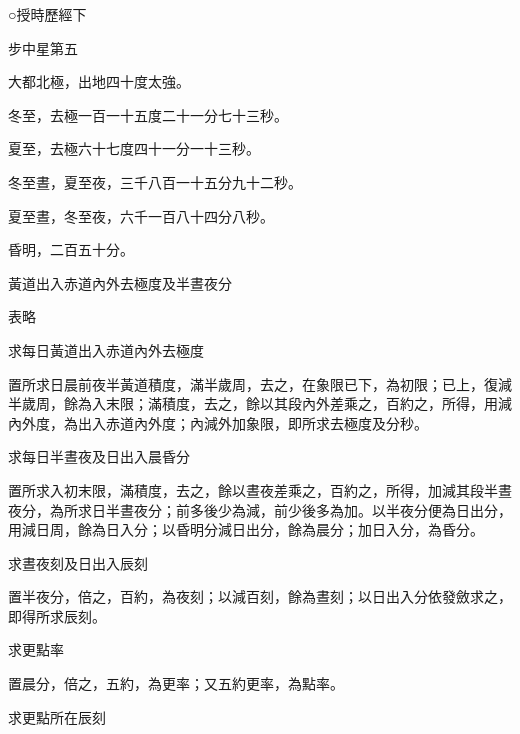 
\begin{pinyinscope}

 ○授時歷經下



 步中星第五



 大都北極，出地四十度太強。



 冬至，去極一百一十五度二十一分七十三秒。



 夏至，去極六十七度四十一分一十三秒。



 冬至晝，夏至夜，三千八百一十五分九十二秒。



 夏至晝，冬至夜，六千一百八十四分八秒。



 昏明，二百五十分。



 黃道出入赤道內外去極度及半晝夜分



 表略



 求每日黃道出入赤道內外去極度



 置所求日晨前夜半黃道積度，滿半歲周，去之，在象限已下，為初限；已上，復減半歲周，餘為入末限；滿積度，去之，餘以其段內外差乘之，百約之，所得，用減內外度，為出入赤道內外度；內減外加象限，即所求去極度及分秒。



 求每日半晝夜及日出入晨昏分



 置所求入初末限，滿積度，去之，餘以晝夜差乘之，百約之，所得，加減其段半晝夜分，為所求日半晝夜分；前多後少為減，前少後多為加。以半夜分便為日出分，用減日周，餘為日入分；以昏明分減日出分，餘為晨分；加日入分，為昏分。



 求晝夜刻及日出入辰刻



 置半夜分，倍之，百約，為夜刻；以減百刻，餘為晝刻；以日出入分依發斂求之，即得所求辰刻。



 求更點率



 置晨分，倍之，五約，為更率；又五約更率，為點率。



 求更點所在辰刻




\end{pinyinscope}
